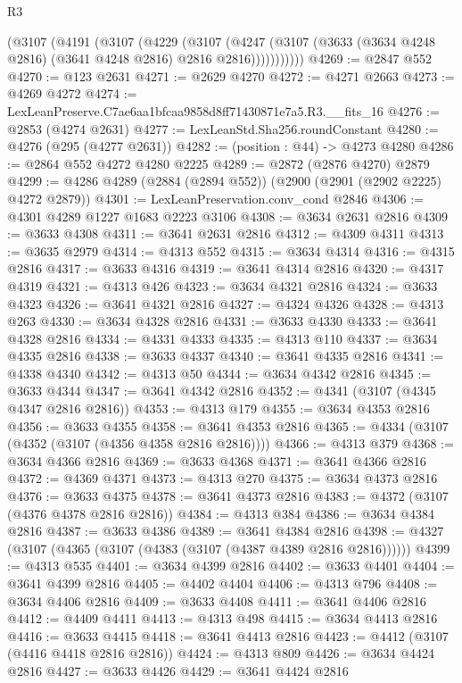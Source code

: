\begin{lexlean}{R3}
\begin{coremodule}
          (@3107
            (@4191
              (@3107
                (@4229
                  (@3107
                    (@4247
                      (@3107 (@3633 (@3634 @4248 @2816) (@3641 @4248 @2816) @2816 @2816)))))))))))
@4269 := @2847 @552
@4270 := @123 @2631
@4271 := @2629 @4270
@4272 := @4271 @2663
@4273 := @4269 @4272
@4274 := LexLeanPreserve.C7ae6aa1bfcaa9858d8ff71430871e7a5.R3.__fits_16
@4276 := @2853 (@4274 @2631)
@4277 := LexLeanStd.Sha256.roundConstant
@4280 := @4276 (@295 (@4277 @2631))
@4282 := (position : @44) -> @4273 @4280
@4286 := @2864 @552 @4272 @4280 @2225
@4289 := @2872 (@2876 @4270) @2879
@4299 := @4286 @4289 (@2884 (@2894 @552)) (@2900 (@2901 (@2902 @2225) @4272 @2879))
@4301 := LexLeanPreservation.conv_cond @2846
@4306 := @4301 @4289 @1227 @1683 @2223 @3106
@4308 := @3634 @2631 @2816
@4309 := @3633 @4308
@4311 := @3641 @2631 @2816
@4312 := @4309 @4311
@4313 := @3635 @2979
@4314 := @4313 @552
@4315 := @3634 @4314
@4316 := @4315 @2816
@4317 := @3633 @4316
@4319 := @3641 @4314 @2816
@4320 := @4317 @4319
@4321 := @4313 @426
@4323 := @3634 @4321 @2816
@4324 := @3633 @4323
@4326 := @3641 @4321 @2816
@4327 := @4324 @4326
@4328 := @4313 @263
@4330 := @3634 @4328 @2816
@4331 := @3633 @4330
@4333 := @3641 @4328 @2816
@4334 := @4331 @4333
@4335 := @4313 @110
@4337 := @3634 @4335 @2816
@4338 := @3633 @4337
@4340 := @3641 @4335 @2816
@4341 := @4338 @4340
@4342 := @4313 @50
@4344 := @3634 @4342 @2816
@4345 := @3633 @4344
@4347 := @3641 @4342 @2816
@4352 := @4341 (@3107 (@4345 @4347 @2816 @2816))
@4353 := @4313 @179
@4355 := @3634 @4353 @2816
@4356 := @3633 @4355
@4358 := @3641 @4353 @2816
@4365 := @4334 (@3107 (@4352 (@3107 (@4356 @4358 @2816 @2816))))
@4366 := @4313 @379
@4368 := @3634 @4366 @2816
@4369 := @3633 @4368
@4371 := @3641 @4366 @2816
@4372 := @4369 @4371
@4373 := @4313 @270
@4375 := @3634 @4373 @2816
@4376 := @3633 @4375
@4378 := @3641 @4373 @2816
@4383 := @4372 (@3107 (@4376 @4378 @2816 @2816))
@4384 := @4313 @384
@4386 := @3634 @4384 @2816
@4387 := @3633 @4386
@4389 := @3641 @4384 @2816
@4398 := @4327 (@3107 (@4365 (@3107 (@4383 (@3107 (@4387 @4389 @2816 @2816))))))
@4399 := @4313 @535
@4401 := @3634 @4399 @2816
@4402 := @3633 @4401
@4404 := @3641 @4399 @2816
@4405 := @4402 @4404
@4406 := @4313 @796
@4408 := @3634 @4406 @2816
@4409 := @3633 @4408
@4411 := @3641 @4406 @2816
@4412 := @4409 @4411
@4413 := @4313 @498
@4415 := @3634 @4413 @2816
@4416 := @3633 @4415
@4418 := @3641 @4413 @2816
@4423 := @4412 (@3107 (@4416 @4418 @2816 @2816))
@4424 := @4313 @809
@4426 := @3634 @4424 @2816
@4427 := @3633 @4426
@4429 := @3641 @4424 @2816

\end{coremodule}
\end{lexlean}
